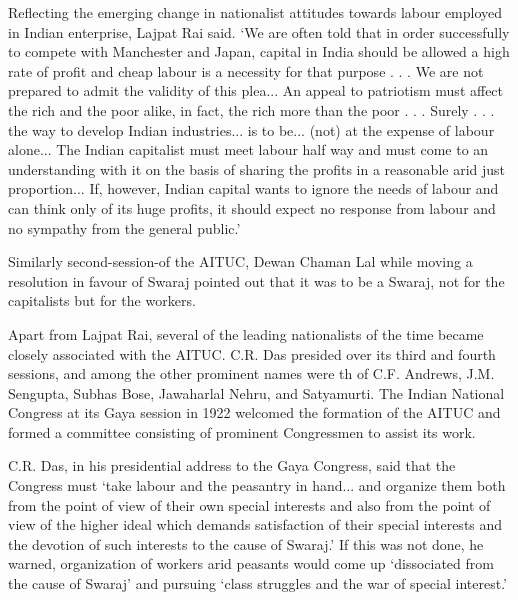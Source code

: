 Reflecting the emerging change in nationalist attitudes towards labour employed in Indian enterprise, Lajpat Rai said. ‘We are often told that in order successfully to compete with Manchester and Japan, capital in India should be allowed a high rate of profit and cheap labour is a necessity for that purpose . . . We are not prepared to admit the validity of this plea... An appeal to patriotism must affect the rich and the poor alike, in fact, the rich more than the poor . . . Surely . . . the way to develop Indian industries... is to be... (not) at the expense of labour alone... The Indian capitalist must meet labour half way and must come to an understanding with it on the basis of sharing the profits in a reasonable arid just proportion... If, however, Indian capital wants to ignore the needs of labour and can think only of its huge profits, it should expect no response from labour and no sympathy from the general public.’

Similarly second-session-of the AITUC, Dewan Chaman Lal while moving a resolution in favour of Swaraj pointed out that it was to be a Swaraj, not for the capitalists but for the workers.

Apart from Lajpat Rai, several of the leading nationalists of the time became closely associated with the AITUC. C.R. Das presided over its third and fourth sessions, and among the other prominent names were th of C.F. Andrews, J.M. Sengupta, Subhas Bose, Jawaharlal Nehru, and Satyamurti. The Indian National Congress at its Gaya session in 1922 welcomed the formation of the AITUC and formed a committee consisting of prominent Congressmen to assist its work.

C.R. Das, in his presidential address to the Gaya Congress, said that the Congress must ‘take labour and the peasantry in hand... and organize them both from the point of view of their own special interests and also from the point of view of the higher ideal which demands satisfaction of their special interests and the devotion of such interests to the cause of Swaraj.’ If this was not done, he warned, organization of workers arid peasants would come up ‘dissociated from the cause of Swaraj’ and pursuing ‘class struggles and the war of special interest.’

